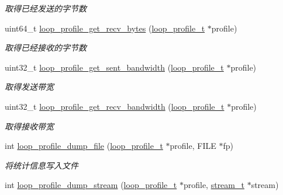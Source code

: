 \begin{DoxyCompactItemize}
\begin{DoxyCompactList}\small\item\em 取得已经发送的字节数 \end{DoxyCompactList}\item 
uint64\+\_\+t \hyperlink{a00079_aabcce950d0234d7dab3740e97f914c95_aabcce950d0234d7dab3740e97f914c95}{loop\+\_\+profile\+\_\+get\+\_\+recv\+\_\+bytes} (\hyperlink{a00050_ad060e1396346d2f5db1ec0597376a107_ad060e1396346d2f5db1ec0597376a107}{loop\+\_\+profile\+\_\+t} $\ast$profile)
\begin{DoxyCompactList}\small\item\em 取得已经接收的字节数 \end{DoxyCompactList}\item 
uint32\+\_\+t \hyperlink{a00079_a05b508d71cdd8841e352657afa86b919_a05b508d71cdd8841e352657afa86b919}{loop\+\_\+profile\+\_\+get\+\_\+sent\+\_\+bandwidth} (\hyperlink{a00050_ad060e1396346d2f5db1ec0597376a107_ad060e1396346d2f5db1ec0597376a107}{loop\+\_\+profile\+\_\+t} $\ast$profile)
\begin{DoxyCompactList}\small\item\em 取得发送带宽 \end{DoxyCompactList}\item 
uint32\+\_\+t \hyperlink{a00079_aa14aa9382129b3c7facf5160ab7b1f7c_aa14aa9382129b3c7facf5160ab7b1f7c}{loop\+\_\+profile\+\_\+get\+\_\+recv\+\_\+bandwidth} (\hyperlink{a00050_ad060e1396346d2f5db1ec0597376a107_ad060e1396346d2f5db1ec0597376a107}{loop\+\_\+profile\+\_\+t} $\ast$profile)
\begin{DoxyCompactList}\small\item\em 取得接收带宽 \end{DoxyCompactList}\item 
int \hyperlink{a00079_ab1f417c556537e763c3b06e9129740a6_ab1f417c556537e763c3b06e9129740a6}{loop\+\_\+profile\+\_\+dump\+\_\+file} (\hyperlink{a00050_ad060e1396346d2f5db1ec0597376a107_ad060e1396346d2f5db1ec0597376a107}{loop\+\_\+profile\+\_\+t} $\ast$profile, F\+I\+L\+E $\ast$fp)
\begin{DoxyCompactList}\small\item\em 将统计信息写入文件 \end{DoxyCompactList}\item 
int \hyperlink{a00079_a8fdc6b3f9949a392d5158ca4b6120bc1_a8fdc6b3f9949a392d5158ca4b6120bc1}{loop\+\_\+profile\+\_\+dump\+\_\+stream} (\hyperlink{a00050_ad060e1396346d2f5db1ec0597376a107_ad060e1396346d2f5db1ec0597376a107}{loop\+\_\+profile\+\_\+t} $\ast$profile, \hyperlink{a00050_a261dba04f46f5c59a68a05f69f5a65a8_a261dba04f46f5c59a68a05f69f5a65a8}{stream\+\_\+t} $\ast$stream)

\end{DoxyCompactItemize}
